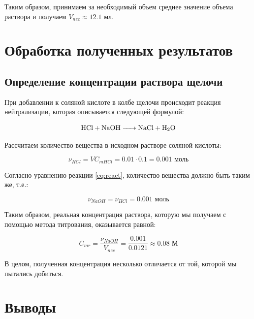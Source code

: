 \documentclass[a4paper, 12pt]{article}
\begin{document}
Таким образом, принимаем за необходимый объем среднее значение объема раствора и получаем $V_{nec} \approx 12.1$ мл.

\section{Обработка полученных результатов}

\subsection{Определение концентрации раствора щелочи}

При добавлении к соляной кислоте в колбе щелочи происходит реакция нейтрализации, которая описывается следующей формулой:

\begin{equation}
	\ce{HCl + NaOH -> NaCl + H2O}
	\label{eq:react}
\end{equation}

Рассчитаем количество вещества  в исходном растворе соляной кислоты:

\begin{equation}
		\nu_{HCl} = V C_{m HCl} = 0.01 \cdot 0.1 = 0.001 \text{ моль}
\end{equation}

Согласно уравнению реакции \ref{eq:react}, количество вещества  должно быть таким же, т.е.:

\begin{equation}
	\nu_{NaOH} = \nu_{HCl} = 0.001 \text{ моль}
\end{equation}

Таким образом, реальная концентрация раствора, которую мы получаем с помощью метода титрования, оказывается равной:

\begin{equation}
		\boxed{
		C_{mr} = \frac{\nu_{NaOH}}{V_{nec}} = \frac{0.001}{0.0121} \approx 0.08 \text{ М}
	}
\end{equation}

В целом, полученная концентрация несколько отличается от той, которой мы пытались добиться.

\bigskip

\section{Выводы}
\end{document}

